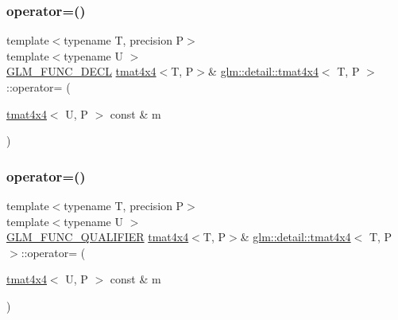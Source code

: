 \mbox{\label{structglm_1_1detail_1_1tmat4x4_a43fc3af37580faf4fa172ab4ccc168ad}} 
\subsubsection{\texorpdfstring{operator=()}{operator=()}\hspace{0.1cm}{\footnotesize\ttfamily [2/3]}}
{\footnotesize\ttfamily template$<$typename T, precision P$>$ \\
template$<$typename U $>$ \\
\hyperlink{setup_8hpp_ab2d052de21a70539923e9bcbf6e83a51}{G\+L\+M\+\_\+\+F\+U\+N\+C\+\_\+\+D\+E\+CL} \hyperlink{structglm_1_1detail_1_1tmat4x4}{tmat4x4}$<$T, P$>$\& \hyperlink{structglm_1_1detail_1_1tmat4x4}{glm\+::detail\+::tmat4x4}$<$ T, P $>$\+::operator= (\begin{DoxyParamCaption}\item[{\hyperlink{structglm_1_1detail_1_1tmat4x4}{tmat4x4}$<$ U, P $>$ const \&}]{m }\end{DoxyParamCaption})}

\mbox{\label{structglm_1_1detail_1_1tmat4x4_a7afed31f7061ff2a5146b9f0c50a8542}} 
\subsubsection{\texorpdfstring{operator=()}{operator=()}\hspace{0.1cm}{\footnotesize\ttfamily [3/3]}}
{\footnotesize\ttfamily template$<$typename T, precision P$>$ \\
template$<$typename U $>$ \\
\hyperlink{setup_8hpp_a33fdea6f91c5f834105f7415e2a64407}{G\+L\+M\+\_\+\+F\+U\+N\+C\+\_\+\+Q\+U\+A\+L\+I\+F\+I\+ER} \hyperlink{structglm_1_1detail_1_1tmat4x4}{tmat4x4}$<$T, P$>$\& \hyperlink{structglm_1_1detail_1_1tmat4x4}{glm\+::detail\+::tmat4x4}$<$ T, P $>$\+::operator= (\begin{DoxyParamCaption}\item[{\hyperlink{structglm_1_1detail_1_1tmat4x4}{tmat4x4}$<$ U, P $>$ const \&}]{m }\end{DoxyParamCaption})}



